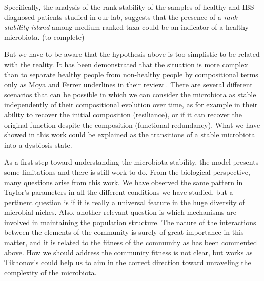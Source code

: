 Specifically, the analysis of the rank stability of the samples of healthy and IBS diagnosed patients studied in our lab\cite{IBS}, suggests that the presence of a \emph{rank stability island} among medium-ranked taxa could be an indicator of a healthy microbiota. (to complete)

But we have to be aware that the hypothesis above is too simplistic to be related with the reality. It has been demonstrated that the situation is more complex than to separate healthy people from non-healthy people by compositional terms only as Moya and Ferrer underlines in their review \cite{Moya_trends}. There are several different scenarios that can be possible in which we can consider the microbiota as stable independently of their compositional evolution over time, as for example in their ability to recover the initial composition (resiliance), or if it can recover the original function despite the composition (functional redundancy). What we have showed in this work could be explained as the transitions of a stable microbiota into a dysbiosis state.  

As a first step toward understanding the microbiota stability, the model presents some limitations and there is still work to do. From the biological perspective, many questions arise from this work. We have observed the same pattern in Taylor's parameters in all the different conditions we have studied, but a pertinent question is if it is really a universal feature in the huge diversity of microbial niches. Also, another relevant question is which mechanisms are involved in maintaining the population structure. The nature of the interactions between the elements of the community is surely of great importance in this matter, and it is related to the fitness of the community as has been commented above. How we should address the community fitness is not clear, but works as Tikhonov's \cite{tikhonov} could help us to aim in the correct direction toward unraveling the complexity of the microbiota.